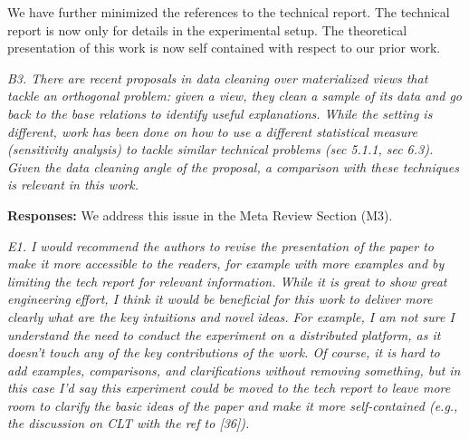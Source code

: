 We have further minimized the references to the technical report. The technical report is now only for details in the experimental setup. The theoretical presentation of this work is now self contained with respect to our prior work.

\vspace{1em}
\emph{B3. There are recent proposals in data cleaning over materialized views that tackle an orthogonal problem: given a view, they clean a sample of its data and go back to the base relations to identify useful explanations. While the setting is different, work has been done on how to use a different statistical measure (sensitivity analysis) to tackle similar technical problems (sec 5.1.1, sec 6.3). Given the data cleaning angle of the proposal, a comparison with these techniques is relevant in this work.}

\vspace{.25em}

{\bf Responses:} We address this issue in the Meta Review Section (M3).

\vspace{1em}
\emph{E1. I would recommend the authors to revise the presentation of the paper to make it more accessible to the readers, for example with more examples and by limiting the tech report for relevant information. While it is great to show great engineering effort, I think it would be beneficial for this work to deliver more clearly what are the key intuitions and novel ideas. For example, I am not sure I understand the need to conduct the experiment on a distributed platform, as it doesn't touch any of the key contributions of the work. Of course, it is hard to add examples, comparisons, and clarifications without removing something, but in this case I'd say this experiment could be moved to the tech report to leave more room to clarify the basic ideas of the paper and make it more self-contained (e.g., the discussion on CLT with the ref to [36]).}

\vspace{.25em}

